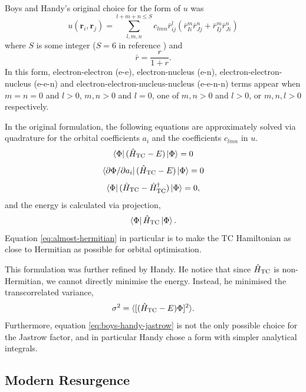 Boys and Handy's original choice for the form of $u$ was
\begin{equation}
    \label{eq:boys-handy-jastrow}
    u(\bm r_i, \bm r_j) = \sum_{l,m,n}^{l+m+n\leq S} c_{lmn}\bar r_{ij}^l(\bar r_{Ii}^m\bar r_{Jj}^n + \bar r_{Ij}^m\bar r_{Ji}^n)
\end{equation}
where $S$ is some integer ($S=6$ in reference )\supercite{cohenSimilarity2019} and
\begin{equation}
    \bar r = \frac{r}{1+r}.
\end{equation}
In this form, electron-electron (e-e), electron-nucleus (e-n), electron-electron-nucleus (e-e-n) and electron-electron-nucleus-nucleus (e-e-n-n) terms appear when $m=n=0$ and $l>0$, $m,n>0$ and $l=0$, one of $m,n>0$ and $l>0$, or $m,n,l>0$ respectively.

In the original formulation,\supercite{boysCalculation1969} the following equations are approximately solved via quadrature for the orbital coefficients $a_i$ and the coefficients $c_{lmn}$ in $u$.
\begin{equation}
    \bra\Phi(\hat H_\mathrm{TC} - E)\ket\Phi = 0
\end{equation}
\begin{equation}
    \bra{\partial\Phi/\partial a_i}(\hat H_\mathrm{TC} - E)\ket\Phi = 0
\end{equation}
\begin{equation}
    \label{eq:almost-hermitian}
    \bra\Phi(\hat H_\mathrm{TC} - \hat H_\mathrm{TC}^\dag)\ket\Phi = 0,
\end{equation}
and the energy is calculated via projection,
\begin{equation}
    \bra\Phi\hat H_\mathrm{TC}\ket\Phi.
\end{equation}
Equation \ref{eq:almost-hermitian} in particular is to make the TC Hamiltonian as close to Hermitian as possible for orbital optimisation.

This formulation was further refined by Handy.\supercite{handyEnergies1969} He notice that since $\hat H_\mathrm{TC}$ is non-Hermitian, we cannot directly minimise the energy. Instead, he minimised the transcorrelated variance,
\begin{equation}
    \sigma^2 = \langle [(\hat H_\mathrm{TC} - E)\Phi]^2\rangle.
\end{equation}
Furthermore, equation \ref{eq:boys-handy-jastrow} is not the only possible choice for the Jastrow factor, and in particular Handy chose a form with simpler analytical integrals.


\subsection{Modern Resurgence}

